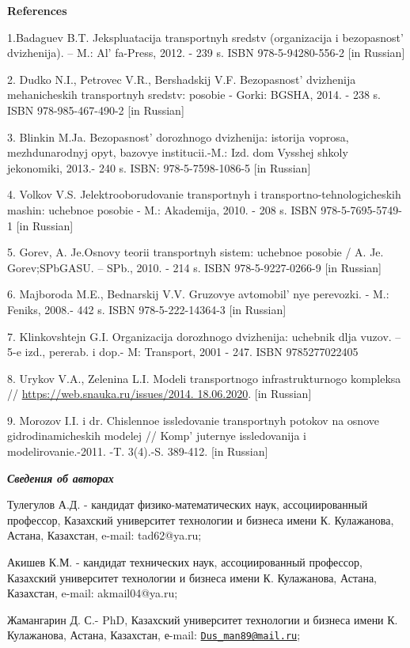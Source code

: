 {\bfseries References}

1.Badaguev B.T. Jekspluatacija transportnyh sredstv (organizacija i
bezopasnost'{} dvizhenija). -- M.:
Al' fa-Press, 2012. - 239 s. ISBN 978-5-94280-556-2 {[}in
Russian{]}

2. Dudko N.I., Petrovec V.R., Bershadskij V.F.
Bezopasnost'{} dvizhenija mehanicheskih transportnyh
sredstv: posobie - Gorki: BGSHA, 2014. - 238 s. ISBN 978-985-467-490-2
{[}in Russian{]}

3. Blinkin M.Ja. Bezopasnost'{} dorozhnogo dvizhenija:
istorija voprosa, mezhdunarodnyj opyt, bazovye institucii.-M.: Izd. dom
Vysshej shkoly jekonomiki, 2013.- 240 s. ISBN: 978-5-7598-1086-5 {[}in
Russian{]}

4. Volkov V.S. Jelektrooborudovanie transportnyh i
transportno-tehnologicheskih mashin: uchebnoe posobie - M.: Akademija,
2010. - 208 s. ISBN 978-5-7695-5749-1 {[}in Russian{]}

5. Gorev, A. Je.Osnovy teorii transportnyh sistem: uchebnoe posobie / A.
Je. Gorev;SPbGASU. -- SPb., 2010. - 214 s. ISBN 978-5-9227-0266-9 {[}in
Russian{]}

6. Majboroda M.E., Bednarskij V.V. Gruzovye
avtomobil' nye perevozki. - M.: Feniks, 2008.- 442 s.
ISBN 978-5-222-14364-3 {[}in Russian{]}

7. Klinkovshtejn G.I. Organizacija dorozhnogo dvizhenija: uchebnik dlja
vuzov. -- 5-e izd., pererab. i dop.- M: Transport, 2001 - 247. ISBN
9785277022405

8. Urykov V.A., Zelenina L.I. Modeli transportnogo infrastrukturnogo
kompleksa //
\href{https://web.snauka.ru/issues/2014.\%2018.06.2020}{https://web.snauka.ru/issues/2014.
18.06.2020}. {[}in Russian{]}

9. Morozov I.I. i dr. Chislennoe issledovanie transportnyh potokov na
osnove gidrodinamicheskih modelej // Komp' juternye
issledovanija i modelirovanie.-2011. -T. 3(4).-S. 389-412. {[}in
Russian{]}

\emph{{\bfseries Сведения об авторах}}

Тулегулов А.Д. - кандидат физико-математических наук, ассоциированный
профессор, Казахский университет технологии и бизнеса имени К.
Кулажанова, Астана, Казахстан, e-mail: tad62@ya.ru;

Акишев К.М. - кандидат технических наук, ассоциированный профессор,
Казахский университет технологии и бизнеса имени К. Кулажанова, Астана,
Казахстан, e-mail: akmail04@ya.ru;

Жамангарин Д. С.- PhD, Казахский университет технологии и бизнеса имени
К. Кулажанова, Астана, Казахстан, е-mail:
\href{mailto:Dus_man89@mail.ru}{\nolinkurl{Dus\_man89@mail.ru}};

